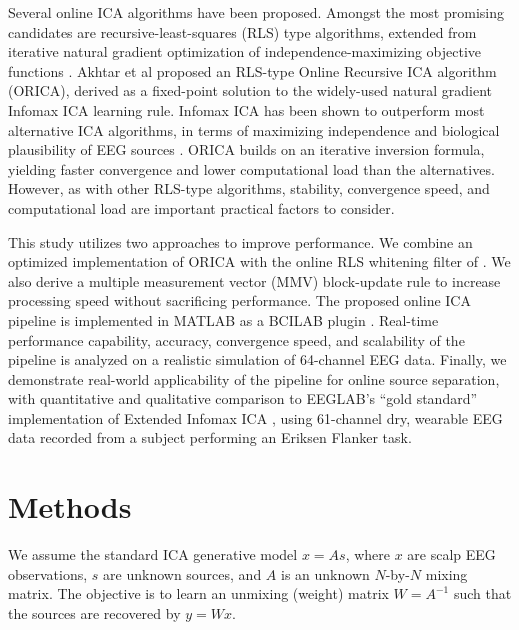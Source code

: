 \documentclass[letterpaper, 10 pt, conference]{ieeeconf}  %
\begin{document}
Several online ICA algorithms have been proposed. Amongst the most promising candidates are recursive-least-squares (RLS) type algorithms, extended from iterative natural gradient optimization of independence-maximizing objective functions \cite{giannakopoulos1999experimental}\cite{zhu2004natural}. Akhtar et al \cite{akhtar2012recursive} proposed an RLS-type Online Recursive ICA algorithm (ORICA), derived as a fixed-point solution to the widely-used natural gradient Infomax ICA learning rule. Infomax ICA has been shown to outperform most alternative ICA algorithms, in terms of maximizing independence and biological plausibility of EEG sources \cite{delorme2012independent}. ORICA builds on an iterative inversion formula, yielding faster convergence and lower computational load than the alternatives. %
However, as with other RLS-type algorithms, stability, convergence speed, and computational load are important practical factors to consider. 

This study utilizes two approaches to improve performance. We combine an optimized implementation of ORICA with the online RLS whitening filter of \cite{zhu2004natural}. We also derive a multiple measurement vector (MMV) block-update rule to increase processing speed without sacrificing performance. The proposed online ICA pipeline is implemented in MATLAB as a BCILAB plugin \cite{kothe2013bcilab}. Real-time performance capability, accuracy, convergence speed, and scalability of the pipeline is analyzed on a realistic simulation of 64-channel EEG data. Finally, we demonstrate real-world applicability of the pipeline for online source separation, with quantitative and qualitative comparison to EEGLAB's ``gold standard'' implementation of Extended Infomax ICA \cite{lee1999independent}, using 61-channel dry, wearable EEG data recorded from a subject performing an Eriksen Flanker task.



\section{Methods}
We assume the standard ICA generative model $x=As$, where $x$ are scalp EEG observations, $s$ are unknown sources, and $A$ is an unknown $N$-by-$N$ mixing matrix. The objective is to learn an unmixing (weight) matrix $W=A^{-1}$ such that the sources are recovered by $y=Wx$.

\end{document}
